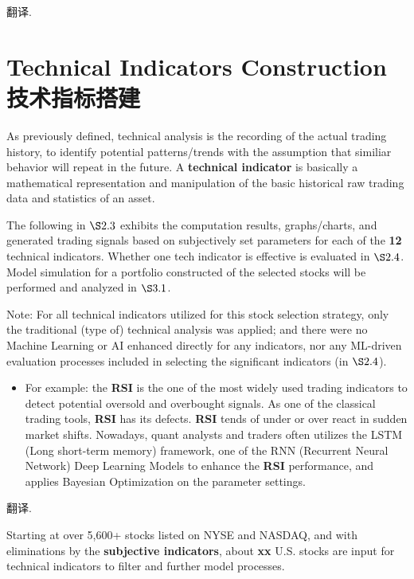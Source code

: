 \documentclass[
]{book}
\providecommand{\tightlist}{%
  \setlength{\itemsep}{0pt}\setlength{\parskip}{0pt}}
\begin{document}
翻译.

\hypertarget{technical-indicators-construction-ux6280ux672fux6307ux6807ux642dux5efa}{%
\chapter{Technical Indicators Construction
技术指标搭建}\label{technical-indicators-construction-ux6280ux672fux6307ux6807ux642dux5efa}}

As previously defined, technical analysis is the recording of the actual
trading history, to identify potential patterns/trends with the
assumption that similiar behavior will repeat in the future. A
\textbf{technical indicator} is basically a mathematical representation
and manipulation of the basic historical raw trading data and statistics
of an asset.

The following in \(\S 2.3\) exhibits the computation results,
graphs/charts, and generated trading signals based on subjectively set
parameters for each of the \textbf{12} technical indicators. Whether one
tech indicator is effective is evaluated in \(\S 2.4\). Model simulation
for a portfolio constructed of the selected stocks will be performed and
analyzed in \(\S 3.1\).

Note: For all technical indicators utilized for this stock selection
strategy, only the traditional (type of) technical analysis was applied;
and there were no Machine Learning or AI enhanced directly for any
indicators, nor any ML-driven evaluation processes included in selecting
the significant indicators (in \(\S 2.4\)).

\begin{itemize}
\tightlist
\item
  For example: the \textbf{RSI} is the one of the most widely used
  trading indicators to detect potential oversold and overbought
  signals. As one of the classical trading tools, \textbf{RSI} has its
  defects. \textbf{RSI} tends of under or over react in sudden market
  shifts. Nowadays, quant analysts and traders often utilizes the LSTM
  (Long short-term memory) framework, one of the RNN (Recurrent Neural
  Network) Deep Learning Models to enhance the \textbf{RSI} performance,
  and applies Bayesian Optimization on the parameter settings.
\end{itemize}

翻译.

Starting at over 5,600+ stocks listed on NYSE and NASDAQ, and with
eliminations by the \textbf{subjective indicators}, about \textbf{xx}
U.S. stocks are input for technical indicators to filter and further
model processes.
\end{document}
